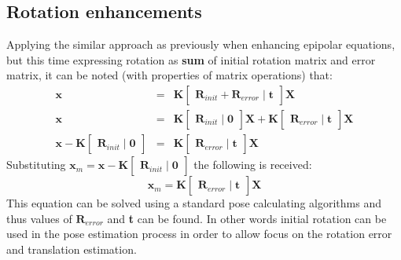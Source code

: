 \subsection{Rotation enhancements}
Applying the similar approach as previously when enhancing epipolar equations, but this time expressing rotation as \textbf{sum} of initial rotation matrix and error matrix, it can be noted (with properties of matrix operations) that:
\begin{equation} \label{eq:projectionRotError1}
\begin{array}{rcl}
 \textbf{x} & = & \textbf{K} \begin{bmatrix}\textbf{R}_{init} + \textbf{R}_{error}\mid \textbf{t}\end{bmatrix} \textbf{X} \\
 \textbf{x} & = & \textbf{K} \begin{bmatrix}\textbf{R}_{init}\mid \textbf{0}\end{bmatrix} \textbf{X} + \textbf{K} \begin{bmatrix}\textbf{R}_{error}\mid \textbf{t}\end{bmatrix} \textbf{X} \\
 \textbf{x} - \textbf{K} \begin{bmatrix}\textbf{R}_{init}\mid \textbf{0}\end{bmatrix} & = & \textbf{K} \begin{bmatrix}\textbf{R}_{error}\mid \textbf{t}\end{bmatrix} \textbf{X}
\end{array}
\end{equation}
Substituting $\textbf{x}_{m} = \textbf{x} - \textbf{K} \begin{bmatrix}\textbf{R}_{init}\mid \textbf{0}\end{bmatrix}$ the following is received: 
\begin{equation} \label{eq:projectionRotError2}
\textbf{x}_{m} = \textbf{K}\begin{bmatrix}\textbf{R}_{error}\mid \textbf{t}\end{bmatrix}\textbf{X}
\end{equation}
This equation can be solved using a standard pose calculating algorithms and thus values of $\textbf{R}_{error}$ and \textbf{t} can be found. In other words initial rotation can be used in the pose estimation process in order to allow focus on the rotation error and translation estimation.
